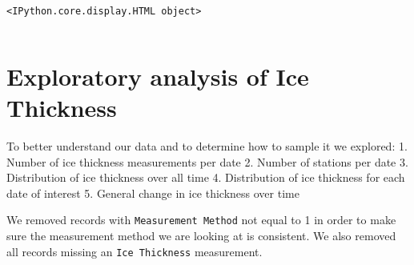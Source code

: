 \documentclass[11pt]{article}
\makeatletter
\newcommand{\boxspacing}{\kern\kvtcb@left@rule\kern\kvtcb@boxsep}
\newcommand{\prompt}[4]{
        {\ttfamily\llap{{\color{#2}[#3]:\hspace{3pt}#4}}\vspace{-\baselineskip}}
    }
\makeatother
\begin{document}
    
    \begin{Verbatim}[commandchars=\\\{\}]

    \end{Verbatim}

    
    \begin{Verbatim}[commandchars=\\\{\}]
<IPython.core.display.HTML object>
    \end{Verbatim}

    
            \begin{tcolorbox}[breakable, size=fbox, boxrule=.5pt, pad at break*=1mm, opacityfill=0]
\prompt{Out}{outcolor}{8}{\boxspacing}
\begin{Verbatim}[commandchars=\\\{\}]

\end{Verbatim}
\end{tcolorbox}
        
    \hypertarget{exploratory-analysis-of-ice-thickness}{%
\section{Exploratory analysis of Ice
Thickness}\label{exploratory-analysis-of-ice-thickness}}

To better understand our data and to determine how to sample it we
explored: 1. Number of ice thickness measurements per date 2. Number of
stations per date 3. Distribution of ice thickness over all time 4.
Distribution of ice thickness for each date of interest 5. General
change in ice thickness over time

We removed records with \texttt{Measurement\ Method} not equal to 1 in
order to make sure the measurement method we are looking at is
consistent. We also removed all records missing an
\texttt{Ice\ Thickness} measurement.
\end{document}
